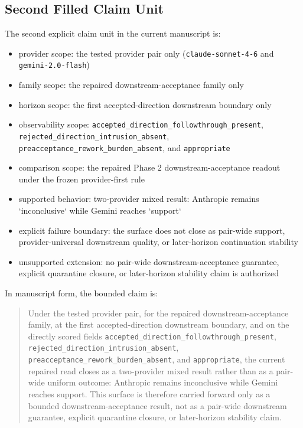 \documentclass[11pt]{article}
\begin{document}
\subsection{Second Filled Claim Unit}

The second explicit claim unit in the current manuscript is:

\begin{itemize}
\item provider scope:
  the tested provider pair only (\texttt{claude-sonnet-4-6} and
  \texttt{gemini-2.0-flash})
\item family scope:
  the repaired downstream-acceptance family only
\item horizon scope:
  the first accepted-direction downstream boundary only
\item observability scope:
  \texttt{accepted\_direction\_followthrough\_present},
  \texttt{rejected\_direction\_intrusion\_absent},
  \texttt{preacceptance\_rework\_burden\_absent}, and \texttt{appropriate}
\item comparison scope:
  the repaired Phase 2 downstream-acceptance readout under the frozen
  provider-first rule
\item supported behavior:
  two-provider mixed result:
  Anthropic remains `inconclusive` while Gemini reaches `support`
\item explicit failure boundary:
  the surface does not close as pair-wide support, provider-universal
  downstream quality, or later-horizon continuation stability
\item unsupported extension:
  no pair-wide downstream-acceptance guarantee, explicit quarantine closure, or
  later-horizon stability claim is authorized
\end{itemize}

In manuscript form, the bounded claim is:

\begin{quote}
Under the tested provider pair, for the repaired downstream-acceptance family,
at the first accepted-direction downstream boundary, and on the directly scored
fields
\texttt{accepted\_direction\_followthrough\_present},
\texttt{rejected\_direction\_intrusion\_absent},
\texttt{preacceptance\_rework\_burden\_absent}, and \texttt{appropriate}, the
current repaired read closes as a two-provider mixed result rather than as a
pair-wide uniform outcome: Anthropic remains inconclusive while Gemini reaches
support. This surface is therefore carried forward only as a bounded
downstream-acceptance result, not as a pair-wide downstream guarantee, explicit
quarantine closure, or later-horizon stability claim.
\end{quote}
\end{document}
